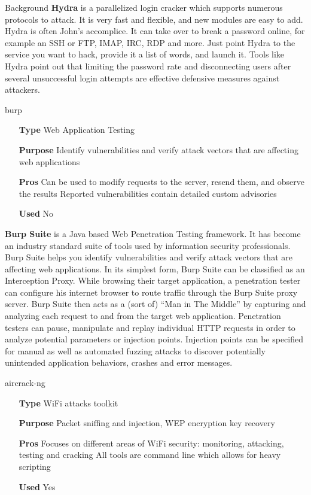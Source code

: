 \begin{chaptercover}{Background}
\textbf{Hydra} \cite{hydra} is a parallelized login cracker which supports numerous protocols to attack. It is very fast and flexible, and new modules are easy to add. Hydra is often John's accomplice. It can take over to break a password online, for example an SSH or FTP, IMAP, IRC, RDP and more. Just point Hydra to the service you want to hack, provide it a list of words, and launch it. Tools like Hydra point out that limiting the password rate and disconnecting users after several unsuccessful login attempts are effective defensive measures against attackers.

\begin{solutiondata}{burp}
\begin{itemize}[labelsep=1cm]
  \item [\textbf{Type}] Web Application Testing
  \item [\textbf{Purpose}] Identify vulnerabilities and verify attack vectors that are affecting web applications
  \item [\textbf{Pros}] Can be used to modify requests to the server, resend them, and observe the results \newline Reported vulnerabilities contain detailed custom advisories
  \item [\textbf{Used}] No
\end{itemize}
\end{solutiondata}

\textbf{Burp Suite} \cite{burp} is a Java based Web Penetration Testing framework. It has become an industry standard suite of tools used by information security professionals. Burp Suite helps you identify vulnerabilities and verify attack vectors that are affecting web applications. In its simplest form, Burp Suite can be classified as an Interception Proxy. While browsing their target application, a penetration tester can configure his internet browser to route traffic through the Burp Suite proxy server. Burp Suite then acts as a (sort of) “Man in The Middle” by capturing and analyzing each request to and from the target web application. Penetration testers can pause, manipulate and replay individual HTTP requests in order to analyze potential parameters or injection points. Injection points can be specified for manual as well as automated fuzzing attacks to discover potentially unintended application behaviors, crashes and error messages.

\begin{solutiondata}{aircrack-ng}
\begin{itemize}[labelsep=1cm]
  \item [\textbf{Type}] WiFi attacks toolkit
  \item [\textbf{Purpose}] Packet sniffing and injection, WEP encryption key recovery
  \item [\textbf{Pros}] Focuses on different areas of WiFi security: monitoring, attacking, testing and cracking \newline All tools are command line which allows for heavy scripting
  \item [\textbf{Used}] Yes
\end{itemize}
\end{solutiondata}


\end{chaptercover}

